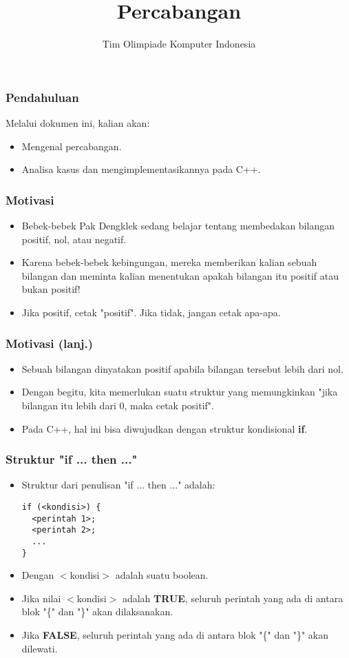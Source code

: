 

\title{Percabangan}
\author{Tim Olimpiade Komputer Indonesia}
\date{}



\begin{frame}
\titlepage
\end{frame}

\begin{frame}
\frametitle{Pendahuluan}
Melalui dokumen ini, kalian akan:
\begin{itemize}
  \item Mengenal percabangan.
  \item Analisa kasus dan mengimplementasikannya pada C++.
\end{itemize}
\end{frame}

\begin{frame}
\frametitle{Motivasi}
\begin{itemize}
  \item Bebek-bebek Pak Dengklek sedang belajar tentang membedakan bilangan positif, nol, atau negatif.
  \item Karena bebek-bebek kebingungan, mereka memberikan kalian sebuah bilangan dan meminta kalian menentukan apakah bilangan itu positif atau bukan positif!
  \item Jika positif, cetak "positif". Jika tidak, jangan cetak apa-apa.
\end{itemize}
\end{frame}

\begin{frame}
\frametitle{Motivasi (lanj.)}
\begin{itemize}
  \item Sebuah bilangan dinyatakan positif apabila bilangan tersebut lebih dari nol.
  \item Dengan begitu, kita memerlukan suatu struktur yang memungkinkan "\alert{jika} bilangan itu lebih dari 0, \alert{maka} cetak positif".
  \item Pada C++, hal ini bisa diwujudkan dengan struktur kondisional \alert{\textbf{if}}.
\end{itemize}
\end{frame}

\begin{frame}[fragile]
\frametitle{Struktur "if ... then ..."}
\begin{itemize}
  \item Struktur dari penulisan "if ... then ..." adalah:
\begin{lstlisting}
if (<kondisi>) {
  <perintah 1>;
  <perintah 2>;
  ...
}
\end{lstlisting}

  \item Dengan $<$kondisi$>$ adalah suatu boolean.
  \item Jika nilai $<$kondisi$>$ adalah \textbf{TRUE}, seluruh perintah yang ada di antara blok "\{" dan "\}" akan dilaksanakan.
  \item Jika \textbf{FALSE}, seluruh perintah yang ada di antara blok "\{" dan "\}" akan dilewati.
\end{itemize}
\end{frame}

